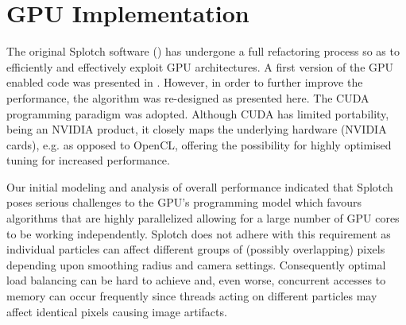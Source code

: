 \section{GPU Implementation}

The original Splotch software (\citet{2008NJPh...10l5006D}) has undergone a full refactoring process so as to efficiently and effectively exploit GPU architectures. A first version of the GPU enabled code was presented in \citet{jin:high-performance}. However, in order to further improve the performance, the algorithm was re-designed as presented here. The CUDA programming paradigm was adopted. Although CUDA has limited portability, being an NVIDIA product, it closely maps the underlying hardware (NVIDIA cards), e.g. as opposed to OpenCL, offering the possibility for highly optimised tuning for increased performance.

Our initial modeling and analysis of overall performance indicated that Splotch poses serious challenges to the GPU's programming model which favours algorithms that are highly parallelized allowing for a large number of GPU cores to be working independently. Splotch does not adhere with this requirement as individual particles can affect different groups of (possibly overlapping) pixels depending upon smoothing radius and camera settings. Consequently optimal load balancing can be hard to achieve and, even worse, concurrent accesses to memory can occur frequently since threads acting on different particles may affect identical pixels causing image artifacts.

